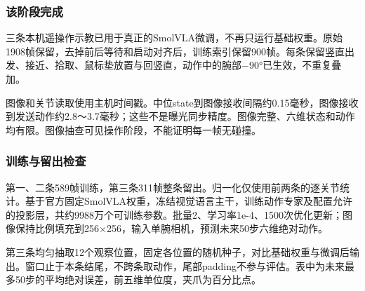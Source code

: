 \subsubsection{该阶段完成}\label{s07-detail-6}

三条本机遥操作示教已用于真正的SmolVLA微调，不再只运行基础权重。原始1908帧保留，去掉前后等待和启动对齐后，训练索引保留900帧。每条保留竖直出发、接近、拾取、鼠标垫放置与回竖直，动作中的腕部−90°已生效，不重复叠加。

图像和关节读取使用主机时间戳。中位state到图像接收间隔约0.15毫秒，图像接收到发送动作约2.8～3.7毫秒；这些不是曝光同步精度。图像完整、六维状态和动作均有限。图像抽查可见操作阶段，不能证明每一帧无碰撞。

\subsubsection{训练与留出检查}\label{s07-detail-7}

第一、二条589帧训练，第三条311帧整条留出。归一化仅使用前两条的逐关节统计。基于官方固定SmolVLA权重，冻结视觉语言主干，训练动作专家及配置允许的投影层，共约9988万个可训练参数。批量2、学习率1e-4、1500次优化更新；图像保持比例填充到256\(\times\)256，输入单腕相机，预测未来50步六维绝对动作。

第三条均匀抽取12个观察位置，固定各位置的随机种子，对比基础权重与微调后输出。窗口止于本条结尾，不跨条取动作，尾部padding不参与评估。表中为未来最多50步的平均绝对误差，前五维单位度，夹爪为百分比点。

